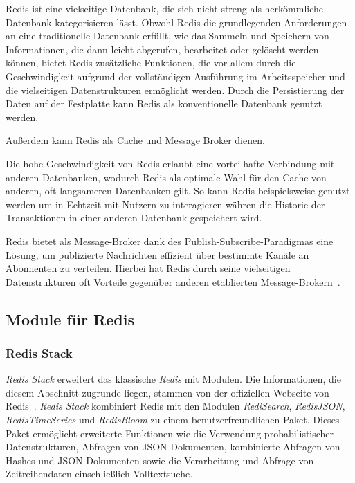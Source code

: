 
Redis ist eine vielseitige Datenbank, die sich nicht streng als herkömmliche Datenbank kategorisieren lässt. Obwohl Redis die grundlegenden Anforderungen an eine traditionelle Datenbank erfüllt, wie das Sammeln und Speichern von Informationen, die dann leicht abgerufen, bearbeitet oder gelöscht werden können, bietet Redis zusätzliche Funktionen, die vor allem durch die Geschwindigkeit aufgrund der vollständigen Ausführung im Arbeitsspeicher und die vielseitigen Datenstrukturen ermöglicht werden.
Durch die Persistierung der Daten auf der Festplatte kann Redis als konventionelle Datenbank genutzt werden.

Außerdem kann Redis als Cache und Message Broker dienen.

Die hohe Geschwindigkeit von Redis erlaubt eine vorteilhafte Verbindung mit anderen Datenbanken, wodurch Redis als optimale Wahl für den Cache von anderen, oft langsameren Datenbanken gilt. So kann Redis beispielsweise genutzt werden um in Echtzeit mit Nutzern zu interagieren währen die Historie der Transaktionen in einer anderen Datenbank gespeichert wird.

Redis bietet als Message-Broker dank des Publish-Subscribe-Paradigmas eine Lösung, um publizierte Nachrichten effizient über bestimmte Kanäle an Abonnenten zu verteilen. Hierbei hat Redis durch seine vielseitigen Datenstrukturen oft Vorteile gegenüber anderen etablierten Message-Brokern~\cite{joshi_you_nodate}.

\subsection{Module für Redis}
\subsubsection{Redis Stack}
\emph{Redis Stack} erweitert das klassische \emph{Redis} mit Modulen.
Die Informationen, die diesem Abschnitt zugrunde liegen, stammen von der offiziellen Webseite von Redis~\cite{redis_ltd_about_nodate}.
\emph{Redis Stack} kombiniert Redis mit den Modulen \emph{RediSearch}, \emph{RedisJSON}, \emph{RedisTimeSeries} und \emph{RedisBloom} zu einem benutzerfreundlichen Paket.
Dieses Paket ermöglicht erweiterte Funktionen wie die Verwendung probabilistischer Datenstrukturen, Abfragen von JSON-Dokumenten, kombinierte Abfragen von Hashes und JSON-Dokumenten sowie die Verarbeitung und Abfrage von Zeitreihendaten einschließlich Volltextsuche.

